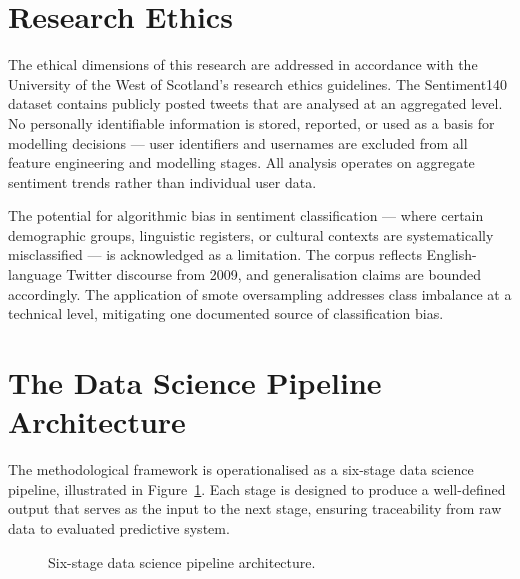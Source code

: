 \section{Research Ethics}

The ethical dimensions of this research are addressed in accordance with the University of the West of Scotland's research ethics guidelines. The Sentiment140 dataset contains publicly posted tweets that are analysed at an aggregated level. No personally identifiable information is stored, reported, or used as a basis for modelling decisions --- user identifiers and usernames are excluded from all feature engineering and modelling stages. All analysis operates on aggregate sentiment trends rather than individual user data.

The potential for algorithmic bias in sentiment classification --- where certain demographic groups, linguistic registers, or cultural contexts are systematically misclassified --- is acknowledged as a limitation. The corpus reflects English-language Twitter discourse from 2009, and generalisation claims are bounded accordingly. The application of \gls{smote} oversampling addresses class imbalance at a technical level, mitigating one documented source of classification bias.

\section{The Data Science Pipeline Architecture}

The methodological framework is operationalised as a six-stage data science pipeline, illustrated in Figure~\ref{fig:pipeline}. Each stage is designed to produce a well-defined output that serves as the input to the next stage, ensuring traceability from raw data to evaluated predictive system.

\begin{figure}[H]
\centering
{}
\caption{Six-stage data science pipeline architecture.}
\label{fig:pipeline}
\end{figure}

